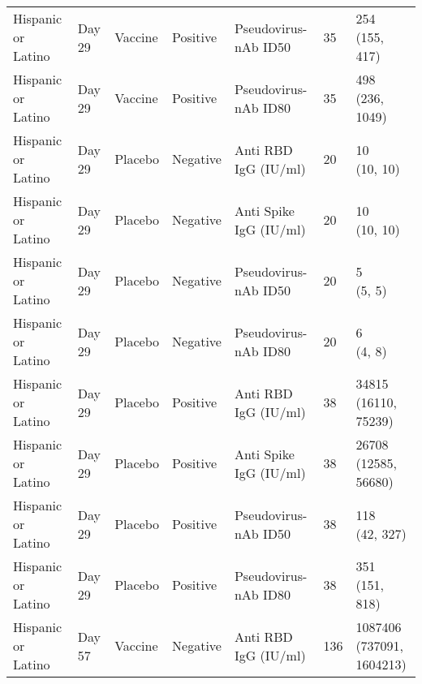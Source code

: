 \documentclass[]{book}
\theoremstyle{definition}
\theoremstyle{definition}
\theoremstyle{definition}
\newcommand{\1}{\mathbbm{1}}
\begin{document}
\begin{landscape}
\begin{ThreePartTable}
\begin{longtable}[t]{>{\raggedright\arraybackslash}p{7cm}llllll}
\hspace{1em}Hispanic or Latino & Day 29 & Vaccine & Positive & Pseudovirus-nAb ID50 & 35 & \makecell[l]{254\\(155, 417)}\\
\hspace{1em}Hispanic or Latino & Day 29 & Vaccine & Positive & Pseudovirus-nAb ID80 & 35 & \makecell[l]{498\\(236, 1049)}\\
\hspace{1em}Hispanic or Latino & Day 29 & Placebo & Negative & Anti RBD IgG (IU/ml) & 20 & \makecell[l]{10\\(10, 10)}\\
\hspace{1em}Hispanic or Latino & Day 29 & Placebo & Negative & Anti Spike IgG (IU/ml) & 20 & \makecell[l]{10\\(10, 10)}\\
\hspace{1em}Hispanic or Latino & Day 29 & Placebo & Negative & Pseudovirus-nAb ID50 & 20 & \makecell[l]{5\\(5, 5)}\\
\hspace{1em}Hispanic or Latino & Day 29 & Placebo & Negative & Pseudovirus-nAb ID80 & 20 & \makecell[l]{6\\(4, 8)}\\
\hspace{1em}Hispanic or Latino & Day 29 & Placebo & Positive & Anti RBD IgG (IU/ml) & 38 & \makecell[l]{34815\\(16110, 75239)}\\
\hspace{1em}Hispanic or Latino & Day 29 & Placebo & Positive & Anti Spike IgG (IU/ml) & 38 & \makecell[l]{26708\\(12585, 56680)}\\
\hspace{1em}Hispanic or Latino & Day 29 & Placebo & Positive & Pseudovirus-nAb ID50 & 38 & \makecell[l]{118\\(42, 327)}\\
\hspace{1em}Hispanic or Latino & Day 29 & Placebo & Positive & Pseudovirus-nAb ID80 & 38 & \makecell[l]{351\\(151, 818)}\\
\hspace{1em}Hispanic or Latino & Day 57 & Vaccine & Negative & Anti RBD IgG (IU/ml) & 136 & \makecell[l]{1087406\\(737091, 1604213)}\\

\end{longtable}
\end{ThreePartTable}
\end{landscape}
\end{document}
